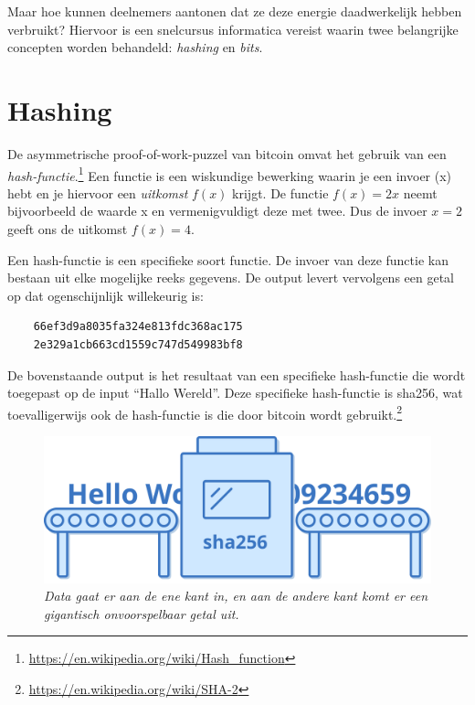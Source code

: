Maar hoe kunnen deelnemers aantonen dat ze deze energie daadwerkelijk hebben verbruikt? Hiervoor is een snelcursus informatica vereist waarin twee belangrijke concepten worden behandeld: \textit{hashing} en \textit{bits}.

\clearpage

\section{Hashing}

De asymmetrische proof-of-work-puzzel van bitcoin omvat het gebruik van een \textit{hash-functie}.\footnote{\href{https://en.wikipedia.org/wiki/Hash\_function}{https://en.wikipedia.org/wiki/Hash\_function}} Een functie is een wiskundige bewerking waarin je een invoer (x) hebt en je hiervoor een \textit{uitkomst} $f(x)$ krijgt. De functie $f(x)=2x$ neemt bijvoorbeeld de waarde x en vermenigvuldigt deze met twee. Dus de invoer $x=2$ geeft ons de uitkomst $f(x)=4$.

Een hash-functie is een specifieke soort functie. De invoer van deze functie kan bestaan uit elke mogelijke reeks gegevens. De output levert vervolgens een getal op dat ogenschijnlijk willekeurig is:

\begin{verbatim}
    66ef3d9a8035fa324e813fdc368ac175
    2e329a1cb663cd1559c747d549983bf8
\end{verbatim}

De bovenstaande output is het resultaat van een specifieke hash-functie die wordt toegepast op de input ``Hallo Wereld''. Deze specifieke hash-functie is sha256, wat toevalligerwijs ook de hash-functie is die door bitcoin wordt gebruikt.\footnote{\href{https://en.wikipedia.org/wiki/SHA-2}{https://en.wikipedia.org/wiki/SHA-2}}

\begin{figure}[h]
    \centering
    \includegraphics[width=\textwidth]{images/fig4.png}
    \caption{\footnotesize{\textit{Data gaat er aan de ene kant in, en aan de andere kant komt er een gigantisch onvoorspelbaar getal uit.}}}
    \label{fig4}
\end{figure}

